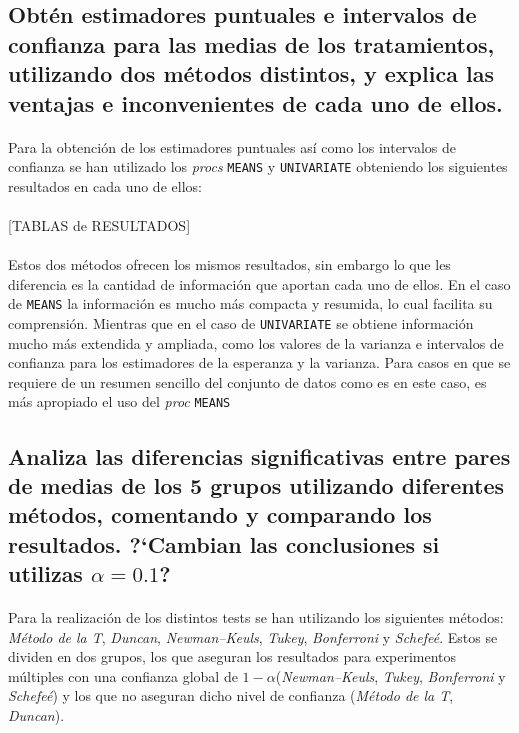 \documentclass{article}
\begin{document}
    \subsection{Obtén estimadores puntuales e intervalos de confianza para las medias de los tratamientos, utilizando dos métodos distintos, y explica las ventajas e inconvenientes de cada uno de ellos.}

      \paragraph{}
      Para la obtención de los estimadores puntuales así como los intervalos de confianza se han utilizado los \emph{procs} \texttt{MEANS} y \texttt{UNIVARIATE} obteniendo los siguientes resultados en cada uno de ellos:


      \paragraph{}
      [TABLAS de RESULTADOS]

      \paragraph{}
      Estos dos métodos ofrecen los mismos resultados, sin embargo lo que les diferencia es la cantidad de información que aportan cada uno de ellos. En el caso de \texttt{MEANS} la información es mucho más compacta y resumida, lo cual facilita su comprensión. Mientras que en el caso de \texttt{UNIVARIATE} se obtiene información mucho más extendida y ampliada, como los valores de la varianza e intervalos de confianza para los estimadores de la esperanza y la varianza. Para casos en que se requiere de un resumen sencillo del conjunto de datos como es en este caso, es más apropiado el uso del \emph{proc} \texttt{MEANS}

    \subsection{Analiza las diferencias significativas entre pares de medias de los 5 grupos utilizando diferentes métodos, comentando y comparando los resultados. ?`Cambian las conclusiones si utilizas $\alpha = 0.1$?}

      \paragraph{}
      Para la realización de los distintos tests se han utilizando los siguientes métodos: \emph{Método de la T}, \emph{Duncan}, \emph{Newman–Keuls}, \emph{Tukey}, \emph{Bonferroni} y \emph{Schefeé}. Estos se dividen en dos grupos, los que aseguran los resultados para experimentos múltiples con una confianza global de $1-\alpha$(\emph{Newman–Keuls}, \emph{Tukey}, \emph{Bonferroni} y \emph{Schefeé}) y los que no aseguran dicho nivel de confianza (\emph{Método de la T}, \emph{Duncan}).
\end{document}
